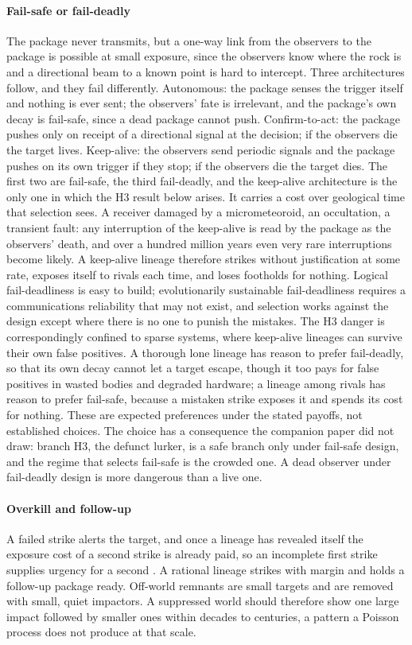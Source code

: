 \documentclass[preprint,12pt]{elsarticle}
\theoremstyle{definition}
\begin{document}
\paragraph{Fail-safe or fail-deadly} The package never transmits, but a one-way link from the observers to the package is possible at small exposure, since the observers know where the rock is and a directional beam to a known point is hard to intercept. Three architectures follow, and they fail differently. Autonomous: the package senses the trigger itself and nothing is ever sent; the observers' fate is irrelevant, and the package's own decay is fail-safe, since a dead package cannot push. Confirm-to-act: the package pushes only on receipt of a directional signal at the decision; if the observers die the target lives. Keep-alive: the observers send periodic signals and the package pushes on its own trigger if they stop; if the observers die the target dies. The first two are fail-safe, the third fail-deadly, and the keep-alive architecture is the only one in which the H3 result below arises. It carries a cost over geological time that selection sees. A receiver damaged by a micrometeoroid, an occultation, a transient fault: any interruption of the keep-alive is read by the package as the observers' death, and over a hundred million years even very rare interruptions become likely. A keep-alive lineage therefore strikes without justification at some rate, exposes itself to rivals each time, and loses footholds for nothing. Logical fail-deadliness is easy to build; evolutionarily sustainable fail-deadliness requires a communications reliability that may not exist, and selection works against the design except where there is no one to punish the mistakes. The H3 danger is correspondingly confined to sparse systems, where keep-alive lineages can survive their own false positives. A thorough lone lineage has reason to prefer fail-deadly, so that its own decay cannot let a target escape, though it too pays for false positives in wasted bodies and degraded hardware; a lineage among rivals has reason to prefer fail-safe, because a mistaken strike exposes it and spends its cost for nothing. These are expected preferences under the stated payoffs, not established choices. The choice has a consequence the companion paper did not draw: branch H3, the defunct lurker, is a safe branch only under fail-safe design, and the regime that selects fail-safe is the crowded one. A dead observer under fail-deadly design is more dangerous than a live one.

\paragraph{Overkill and follow-up} A failed strike alerts the target, and once a lineage has revealed itself the exposure cost of a second strike is already paid, so an incomplete first strike supplies urgency for a second \citep{Dam2026}. A rational lineage strikes with margin and holds a follow-up package ready. Off-world remnants are small targets and are removed with small, quiet impactors. A suppressed world should therefore show one large impact followed by smaller ones within decades to centuries, a pattern a Poisson process does not produce at that scale.
\end{document}
